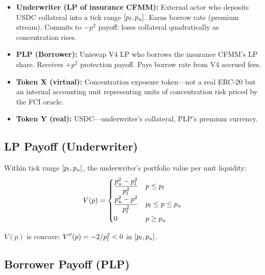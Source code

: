 \begin{definition}\label{def:cfmm-roles}
\begin{itemize}
  \item \textbf{Underwriter (LP of insurance CFMM):} External actor who deposits USDC
    collateral into a tick range $[p_l, p_u]$. Earns borrow rate (premium stream).
    Commits to $-p^2$ payoff: loses collateral quadratically as concentration rises.

  \item \textbf{PLP (Borrower):} Uniswap V4 LP who borrows the insurance CFMM's LP
    share. Receives $+p^2$ protection payoff. Pays borrow rate from V4 accrued fees.

  \item \textbf{Token X (virtual):} Concentration exposure token---not a real ERC-20
    but an internal accounting unit representing units of concentration risk priced
    by the FCI oracle.

  \item \textbf{Token Y (real):} USDC---underwriter's collateral, PLP's premium currency.
\end{itemize}
\end{definition}

\subsection{LP Payoff (Underwriter)}

Within tick range $[p_l, p_u]$, the underwriter's portfolio value per unit liquidity:
\begin{equation}\label{eq:lp-payoff}
  V(p) = \begin{cases}
    \dfrac{p_u^2 - p_l^2}{p_l^2} & p \leq p_l \\[6pt]
    \dfrac{p_u^2 - p^2}{p_l^2}   & p_l \leq p \leq p_u \\[6pt]
    0                              & p \geq p_u
  \end{cases}
\end{equation}

\begin{proposition}[Concavity]\label{prop:lp-concavity}
$V(p)$ is concave: $V''(p) = -2/p_l^2 < 0$ in $[p_l, p_u]$.
\end{proposition}

\subsection{Borrower Payoff (PLP)}


